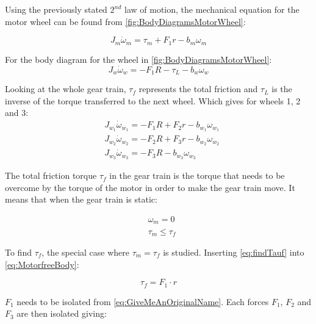 Using the previously stated $2^{nd}$ law of motion, the mechanical equation for the motor wheel can be found from \autoref{fig:BodyDiagramsMotorWheel}:

\begin{equation}
    J_m \dot{\omega}_m = \tau_m + F_1r - b_m\omega_m
    \label{eq:MotorfreeBody}
\end{equation}

For the body diagram for the wheel in \autoref{fig:BodyDiagramsMotorWheel}:
\begin{equation}
	J_w\dot{\omega}_w = -F_1R -\tau_L -b_w\omega_w
\end{equation}

Looking at the whole gear train, $\tau_f$ represents the total friction and $\tau_L$ is the inverse of the torque transferred to the next wheel. Which gives for wheels 1, 2 and 3:
\begin{subequations} 
	\begin{flalign}
		&J_{w_1}\dot{\omega}_{w_1} = -F_1R + F_2r -b_{w_1}\omega_{w_1} \\ \label{eq:GiveMeAnOriginalName}
		&J_{w_2}\dot{\omega}_{w_2} = -F_2R + F_3r -b_{w_2}\omega_{w_2} \\
		&J_{w_3}\dot{\omega}_{w_3} = -F_3R - b_{w_3}\omega_{w_3}
	\end{flalign}
\end{subequations}

The total friction torque $\tau_f$ in the gear train is the torque that needs to be overcome by the torque of the motor in order to make the gear train move. It means that when the gear train is static:

\begin{subequations} \label{eq:findTauf}
	\begin{flalign}
		&\omega_m = 0\\
		&\tau_m \leqslant \tau_f
	\end{flalign}
\end{subequations}

To find $\tau_f$, the special case where $\tau_m = \tau_f$ is studied. Inserting \autoref{eq:findTauf} into \autoref{eq:MotorfreeBody}:

\begin{equation} 
		\tau_f = F_1 \cdot r
		\label{eq:TaufF1r}
\end{equation}

$F_1$ needs to be isolated from \autoref{eq:GiveMeAnOriginalName}. Each forces $F_1$, $F_2$ and $F_3$ are then isolated giving: 

